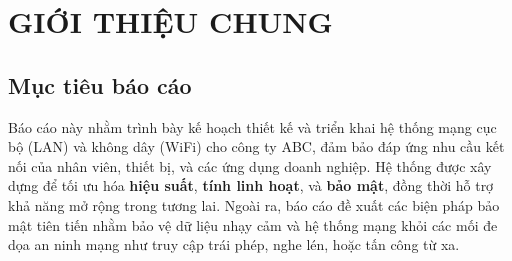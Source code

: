 \chapter{GIỚI THIỆU CHUNG}
\label{sec:gioi_thieu_chung} %

\section{Mục tiêu báo cáo}
\label{subsec:muc_tieu_bao_cao} %
Báo cáo này nhằm trình bày kế hoạch thiết kế và triển khai hệ thống mạng cục bộ (LAN) và không dây (WiFi) cho công ty ABC, đảm bảo đáp ứng nhu cầu kết nối của nhân viên, thiết bị, và các ứng dụng doanh nghiệp. Hệ thống được xây dựng để tối ưu hóa \textbf{hiệu suất}, \textbf{tính linh hoạt}, và \textbf{bảo mật}, đồng thời hỗ trợ khả năng mở rộng trong tương lai. Ngoài ra, báo cáo đề xuất các biện pháp bảo mật tiên tiến nhằm bảo vệ dữ liệu nhạy cảm và hệ thống mạng khỏi các mối đe dọa an ninh mạng như truy cập trái phép, nghe lén, hoặc tấn công từ xa.

